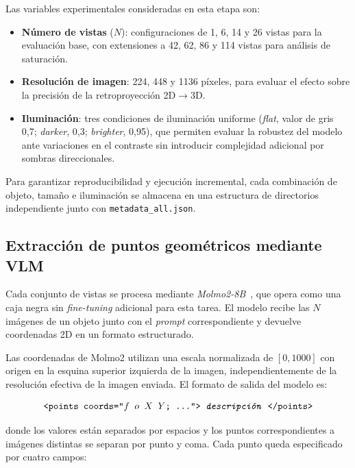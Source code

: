 Las variables experimentales consideradas en esta etapa son:

\begin{itemize}
    \item \textbf{Número de vistas} ($N$): configuraciones de 1, 6, 14 y 26
          vistas para la evaluación base, con extensiones a 42, 62, 86 y 114
          vistas para análisis de saturación.
    \item \textbf{Resolución de imagen}: 224, 448 y 1136 píxeles, para evaluar
          el efecto sobre la precisión de la retroproyección 2D$\rightarrow$3D.
    \item \textbf{Iluminación}: tres condiciones de iluminación uniforme
          (\textit{flat}, valor de gris 0,7; \textit{darker}, 0,3;
          \textit{brighter}, 0,95), que permiten evaluar la robustez del modelo
          ante variaciones en el contraste sin introducir complejidad adicional
          por sombras direccionales.
\end{itemize}

Para garantizar reproducibilidad y ejecución incremental, cada combinación de
objeto, tamaño e iluminación se almacena en una estructura de directorios
independiente junto con \texttt{metadata\_all.json}.

\newpage
\subsection{Extracción de puntos geométricos mediante VLM}
\label{sec:extraccion_vlm}

Cada conjunto de vistas se procesa mediante \textit{Molmo2-8B}~\cite{clark2026molmo2},
que opera como una caja negra sin \textit{fine-tuning} adicional para esta tarea.
El modelo recibe las $N$ imágenes de un objeto junto con el \textit{prompt}
correspondiente y devuelve coordenadas 2D en un formato estructurado.

Las coordenadas de Molmo2 utilizan una escala normalizada de $[0, 1000]$ con
origen en la esquina superior izquierda de la imagen, independientemente de la
resolución efectiva de la imagen enviada. El formato de salida del modelo es:

\begin{equation}
    \texttt{<points\ coords="$f$\ $o$\ $X$\ $Y$;\ \ldots">\ \textit{descripción}\ </points>}
\end{equation}

donde los valores están separados por espacios y los puntos correspondientes a
imágenes distintas se separan por punto y coma. Cada punto queda especificado por
cuatro campos:

